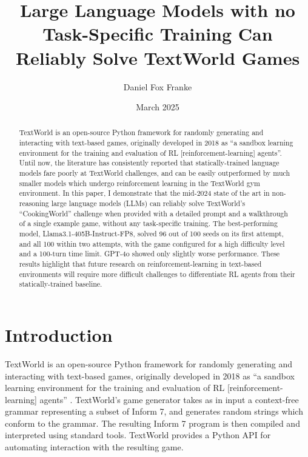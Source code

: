 \documentclass{article}
\title{Large Language Models with no Task-Specific Training Can
Reliably Solve TextWorld Games}
\author{Daniel Fox Franke}
\date{March 2025}
\begin{document}
\begin{titlingpage}
  \maketitle
  \begin{abstract}
    TextWorld is an open-source Python framework for randomly generating and
    interacting with text-based games, originally developed in 2018 as ``a
    sandbox learning environment for the training and evaluation of RL
    [reinforcement-learning] agents''. Until now, the literature has
    consistently reported that statically-trained language models fare poorly at
    TextWorld challenges, and can be easily outperformed by much smaller models
    which undergo reinforcement learning in the TextWorld gym environment. In
    this paper, I demonstrate that the mid-2024 state of the art in
    non-reasoning large language models (LLMs) can reliably solve TextWorld's
    ``CookingWorld'' challenge when provided with a detailed prompt and a
    walkthrough of a single example game, without any task-specific training.
    The best-performing model, Llama3.1-405B-Instruct-FP8, solved 96 out of 100
    seeds on its first attempt, and all 100 within two attempts, with the game
    configured for a high difficulty level and a 100-turn time limit. GPT-4o
    showed only slightly worse performance. These results highlight that future
    research on reinforcement-learning in text-based environments will require
    more difficult challenges to differentiate RL agents from their
    statically-trained baseline.
  \end{abstract}
  \vfil
  \begin{center}
  \end{center}

\end{titlingpage}

\section{Introduction}
TextWorld is an open-source Python framework for randomly generating and
interacting with text-based games, originally developed in 2018 as ``a sandbox
learning environment for the training and evaluation of RL
[reinforcement-learning] agents'' \autocite{Ct2018TextWorldAL}. TextWorld's game
generator takes as in input a context-free grammar representing a subset of
Inform 7, and generates random strings which conform to the grammar. The
resulting Inform 7 program is then compiled and interpreted using standard
tools. TextWorld provides a Python API for automating interaction with the
resulting game.
\end{document}
